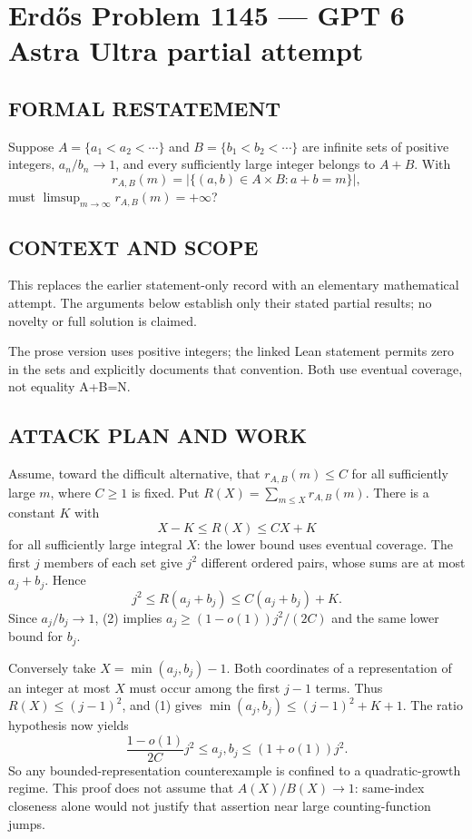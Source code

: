 \section*{Erd\H{o}s Problem 1145 --- GPT 6 Astra Ultra partial attempt}


\subsection*{FORMAL RESTATEMENT}
Suppose $A=\{a_1<a_2<\cdots\}$ and $B=\{b_1<b_2<\cdots\}$ are infinite sets of positive integers, $a_n/b_n\to1$, and every sufficiently large integer belongs to $A+B$. With
\[
r_{A,B}(m)=|\{(a,b)\in A\times B:a+b=m\}|,
\]
must $\limsup_{m\to\infty}r_{A,B}(m)=+\infty$?

\subsection*{CONTEXT AND SCOPE}
This replaces the earlier statement-only record with an elementary mathematical attempt. The arguments below establish only their stated partial results; no novelty or full solution is claimed.

The prose version uses positive integers; the linked Lean statement permits zero in the sets and explicitly documents that convention. Both use eventual coverage, not equality A+B=N.

\subsection*{ATTACK PLAN AND WORK}
Assume, toward the difficult alternative, that $r_{A,B}(m)\le C$ for all
sufficiently large $m$, where $C\ge1$ is fixed. Put
$R(X)=\sum_{m\le X}r_{A,B}(m)$. There is a constant $K$ with
\[X-K\le R(X)\le CX+K\tag{1}\]
for all sufficiently large integral $X$: the lower bound uses eventual coverage.
The first $j$ members of each set give $j^2$ different ordered pairs, whose sums
are at most $a_j+b_j$. Hence
\[j^2\le R(a_j+b_j)\le C(a_j+b_j)+K.\tag{2}\]
Since $a_j/b_j\to1$, (2) implies
$a_j\ge(1-o(1))j^2/(2C)$ and the same lower bound for $b_j$.

Conversely take $X=\min(a_j,b_j)-1$. Both coordinates of a representation of
an integer at most $X$ must occur among the first $j-1$ terms. Thus
$R(X)\le(j-1)^2$, and (1) gives $\min(a_j,b_j)\le(j-1)^2+K+1$.
The ratio hypothesis now yields
\[
\frac{1-o(1)}{2C}j^2\le a_j,b_j\le(1+o(1))j^2.\tag{3}\]
So any bounded-representation counterexample is confined to a quadratic-growth
regime. This proof does not assume that $A(X)/B(X)\to1$: same-index closeness
alone would not justify that assertion near large counting-function jumps.

